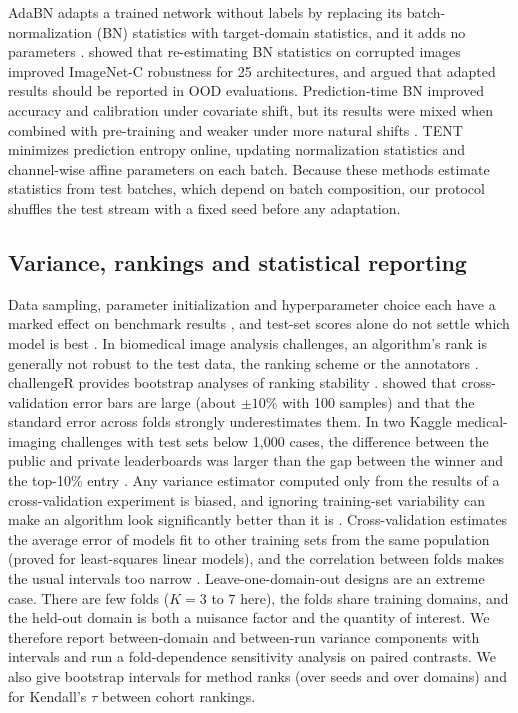 AdaBN adapts a trained network without labels by replacing its
batch-normalization (BN) statistics with target-domain statistics, and it adds
no parameters \citep{li2017adabn}. \citet{schneider2020bn} showed that
re-estimating BN statistics on corrupted images improved ImageNet-C robustness
for 25 architectures, and argued that adapted results should be reported in OOD
evaluations. Prediction-time BN improved accuracy and calibration under
covariate shift, but its results were mixed when combined with pre-training and
weaker under more natural shifts \citep{nado2020bn}. TENT \citep{wang2021tent}
minimizes prediction entropy online, updating normalization statistics and
channel-wise affine parameters on each batch. Because these methods estimate
statistics from test batches, which depend on batch composition, our protocol
shuffles the test stream with a fixed seed before any adaptation.

\subsection{Variance, rankings and statistical reporting}
\label{sec:related-stats}

Data sampling, parameter initialization and hyperparameter choice each have a
marked effect on benchmark results \citep{bouthillier2021variance}, and
test-set scores alone do not settle which model is best \citep{dodge2019show}.
In biomedical image analysis challenges, an algorithm's rank is generally not
robust to the test data, the ranking scheme or the annotators
\citep{maierhein2018rankings}. challengeR provides bootstrap analyses of ranking
stability \citep{wiesenfarth2021challenger}. \citet{varoquaux2018cv} showed
that cross-validation error bars are large (about $\pm 10\%$ with 100 samples)
and that the standard error across folds strongly underestimates them. In two
Kaggle medical-imaging challenges with test sets below 1,000 cases, the
difference between the public and private leaderboards was larger than the gap
between the winner and the top-10\% entry \citep{varoquaux2022failures}. Any variance estimator computed only from the
results of a cross-validation experiment is biased, and ignoring
training-set variability can make an algorithm look significantly better than
it is \citep{nadeau2003inference}. Cross-validation estimates the average error
of models fit to other training sets from the same population (proved for
least-squares linear models), and the correlation between folds makes
the usual intervals too narrow \citep{bates2023cv}. Leave-one-domain-out
designs are an extreme case. There are few folds ($K=3$ to $7$ here), the folds
share training domains, and the held-out domain is both a nuisance factor and
the quantity of interest. We therefore report between-domain and between-run
variance components with intervals and run a fold-dependence sensitivity
analysis on paired contrasts. We also give bootstrap intervals for method ranks
(over seeds and over domains) and for Kendall's $\tau$ between cohort rankings.
